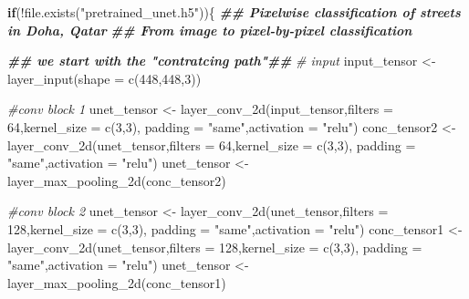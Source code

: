\documentclass[
]{article}
\newenvironment{Shaded}{\begin{snugshade}}{\end{snugshade}}
\newcommand{\AttributeTok}[1]{\textcolor[rgb]{0.77,0.63,0.00}{#1}}
\newcommand{\CommentTok}[1]{\textcolor[rgb]{0.56,0.35,0.01}{\textit{#1}}}
\newcommand{\ControlFlowTok}[1]{\textcolor[rgb]{0.13,0.29,0.53}{\textbf{#1}}}
\newcommand{\DecValTok}[1]{\textcolor[rgb]{0.00,0.00,0.81}{#1}}
\newcommand{\DocumentationTok}[1]{\textcolor[rgb]{0.56,0.35,0.01}{\textbf{\textit{#1}}}}
\newcommand{\FunctionTok}[1]{\textcolor[rgb]{0.00,0.00,0.00}{#1}}
\newcommand{\NormalTok}[1]{#1}
\newcommand{\OtherTok}[1]{\textcolor[rgb]{0.56,0.35,0.01}{#1}}
\newcommand{\SpecialCharTok}[1]{\textcolor[rgb]{0.00,0.00,0.00}{#1}}
\newcommand{\StringTok}[1]{\textcolor[rgb]{0.31,0.60,0.02}{#1}}
\begin{document}
\begin{Shaded}
\begin{Highlighting}[]
\ControlFlowTok{if}\NormalTok{(}\SpecialCharTok{!}\FunctionTok{file.exists}\NormalTok{(}\StringTok{"pretrained\_unet.h5"}\NormalTok{))\{}
  \DocumentationTok{\#\# Pixelwise classification of streets in Doha, Qatar}
  \DocumentationTok{\#\# From image to pixel{-}by{-}pixel classification}
  
  \DocumentationTok{\#\# we start with the "contratcing path"\#\#}
  \CommentTok{\# input}
\NormalTok{  input\_tensor }\OtherTok{\textless{}{-}} \FunctionTok{layer\_input}\NormalTok{(}\AttributeTok{shape =} \FunctionTok{c}\NormalTok{(}\DecValTok{448}\NormalTok{,}\DecValTok{448}\NormalTok{,}\DecValTok{3}\NormalTok{))}
  
  \CommentTok{\#conv block 1}
\NormalTok{  unet\_tensor }\OtherTok{\textless{}{-}} \FunctionTok{layer\_conv\_2d}\NormalTok{(input\_tensor,}\AttributeTok{filters =} \DecValTok{64}\NormalTok{,}\AttributeTok{kernel\_size =} \FunctionTok{c}\NormalTok{(}\DecValTok{3}\NormalTok{,}\DecValTok{3}\NormalTok{),}
                               \AttributeTok{padding =} \StringTok{"same"}\NormalTok{,}\AttributeTok{activation =} \StringTok{"relu"}\NormalTok{)}
\NormalTok{  conc\_tensor2 }\OtherTok{\textless{}{-}} \FunctionTok{layer\_conv\_2d}\NormalTok{(unet\_tensor,}\AttributeTok{filters =} \DecValTok{64}\NormalTok{,}\AttributeTok{kernel\_size =} \FunctionTok{c}\NormalTok{(}\DecValTok{3}\NormalTok{,}\DecValTok{3}\NormalTok{), }
                                \AttributeTok{padding =} \StringTok{"same"}\NormalTok{,}\AttributeTok{activation =} \StringTok{"relu"}\NormalTok{)}
\NormalTok{  unet\_tensor }\OtherTok{\textless{}{-}} \FunctionTok{layer\_max\_pooling\_2d}\NormalTok{(conc\_tensor2)}
  
  \CommentTok{\#conv block 2}
\NormalTok{  unet\_tensor }\OtherTok{\textless{}{-}} \FunctionTok{layer\_conv\_2d}\NormalTok{(unet\_tensor,}\AttributeTok{filters =} \DecValTok{128}\NormalTok{,}\AttributeTok{kernel\_size =} \FunctionTok{c}\NormalTok{(}\DecValTok{3}\NormalTok{,}\DecValTok{3}\NormalTok{), }
                               \AttributeTok{padding =} \StringTok{"same"}\NormalTok{,}\AttributeTok{activation =} \StringTok{"relu"}\NormalTok{)}
\NormalTok{  conc\_tensor1 }\OtherTok{\textless{}{-}} \FunctionTok{layer\_conv\_2d}\NormalTok{(unet\_tensor,}\AttributeTok{filters =} \DecValTok{128}\NormalTok{,}\AttributeTok{kernel\_size =} \FunctionTok{c}\NormalTok{(}\DecValTok{3}\NormalTok{,}\DecValTok{3}\NormalTok{), }
                                \AttributeTok{padding =} \StringTok{"same"}\NormalTok{,}\AttributeTok{activation =} \StringTok{"relu"}\NormalTok{)}
\NormalTok{  unet\_tensor }\OtherTok{\textless{}{-}} \FunctionTok{layer\_max\_pooling\_2d}\NormalTok{(conc\_tensor1)}
  

\end{Highlighting}
\end{Shaded}
\end{document}
